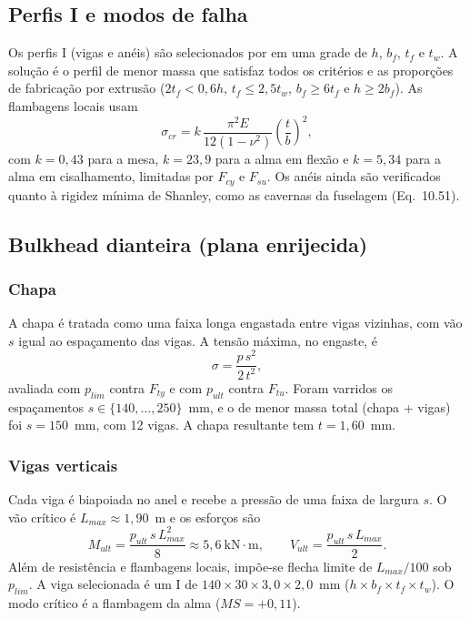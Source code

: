 \subsection{Perfis I e modos de falha}

Os perfis I (vigas e anéis) são selecionados por em uma grade de $h$, $b_f$, $t_f$ e $t_w$. A solução é o perfil de menor massa que satisfaz todos os critérios e as proporções de fabricação por extrusão ($2t_f < 0{,}6h$, $t_f \leq 2{,}5t_w$, $b_f \geq 6t_f$ e $h \geq 2b_f$). As flambagens locais usam
\begin{equation}
    \sigma_{cr} = k\,\dfrac{\pi^2 E}{12(1-\nu^2)}\left(\dfrac{t}{b}\right)^2,
\end{equation}
com $k = 0{,}43$ para a mesa, $k = 23{,}9$ para a alma em flexão e $k = 5{,}34$ para a alma em cisalhamento, limitadas por $F_{cy}$ e $F_{su}$. Os anéis ainda são verificados quanto à rigidez mínima de Shanley, como as cavernas da fuselagem (Eq.~10.51).

\subsection{Bulkhead dianteira (plana enrijecida)}

\subsubsection{Chapa}

A chapa é tratada como uma faixa longa engastada entre vigas vizinhas, com vão $s$ igual ao espaçamento das vigas. A tensão máxima, no engaste, é
\begin{equation}
    \sigma = \dfrac{p\,s^2}{2\,t^2},
\end{equation}
avaliada com $p_{lim}$ contra $F_{ty}$ e com $p_{ult}$ contra $F_{tu}$. Foram varridos os espaçamentos $s \in \{140, \dots, 250\}$~mm, e o de menor massa total (chapa + vigas) foi $s = 150$~mm, com 12 vigas. A chapa resultante tem $t = 1{,}60$~mm.

\subsubsection{Vigas verticais}

Cada viga é biapoiada no anel e recebe a pressão de uma faixa de largura $s$. O vão crítico é $L_{max} \approx 1{,}90$~m e os esforços são
\begin{equation}
    M_{ult} = \dfrac{p_{ult}\,s\,L_{max}^2}{8} \approx 5{,}6~\text{kN}\cdot\text{m}, \qquad
    V_{ult} = \dfrac{p_{ult}\,s\,L_{max}}{2}.
\end{equation}
Além de resistência e flambagens locais, impõe-se flecha limite de $L_{max}/100$ sob $p_{lim}$. A viga selecionada é um I de $140 \times 30 \times 3{,}0 \times 2{,}0$~mm ($h \times b_f \times t_f \times t_w$). O modo crítico é a flambagem da alma ($MS = +0{,}11$).

